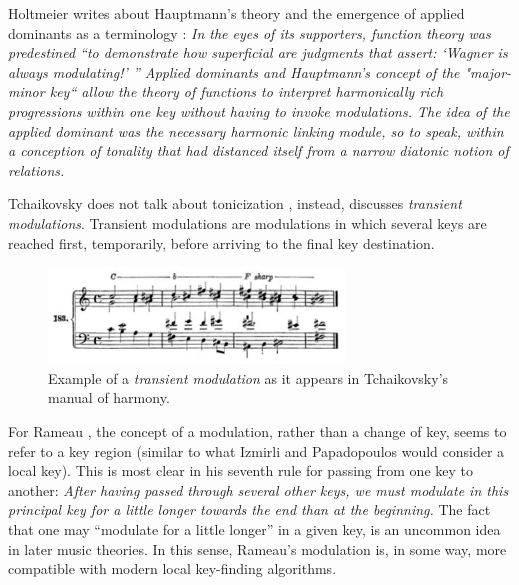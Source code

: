 Holtmeier writes about Hauptmann’s theory and the emergence of applied dominants as a terminology \cite{gollin2012reception}: \emph{In the eyes of its supporters, function theory was predestined ``to demonstrate how superficial are judgments that assert: `Wagner is always modulating!' '' Applied dominants and Hauptmann's concept of the "major-minor key“ allow the theory of functions to interpret harmonically rich progressions within one key without having to invoke modulations. The idea of the applied dominant was the necessary harmonic linking module, so to speak, within a conception of tonality that had distanced itself from a narrow diatonic notion of relations.}

Tchaikovsky does not talk about tonicization \cite{tchaikovsky2005guide}, instead, discusses \emph{transient modulations}. Transient modulations are modulations in which several keys are reached first, temporarily, before arriving to the final key destination.

\begin{figure}[h]
    \centering
    \includegraphics[width=0.7\textwidth]{figures/Q6_2.png}
    \caption{Example of a \emph{transient modulation} as it appears in Tchaikovsky's manual of harmony.}
    \label{fig:Q6_2}
\end{figure}

For Rameau \cite{rameau1971treatise}, the concept of a modulation, rather than a change of key, seems to refer to a key region (similar to what Izmirli and Papadopoulos would consider a local key). This is most clear in his seventh rule for passing from one key to another: \emph{After having passed through several other keys, we must modulate in this principal key for a little longer towards the end than at the beginning.} The fact that one may ``modulate for a little longer'' in a given key, is an uncommon idea in later music theories. In this sense, Rameau's modulation is, in some way, more compatible with modern local key-finding algorithms.






